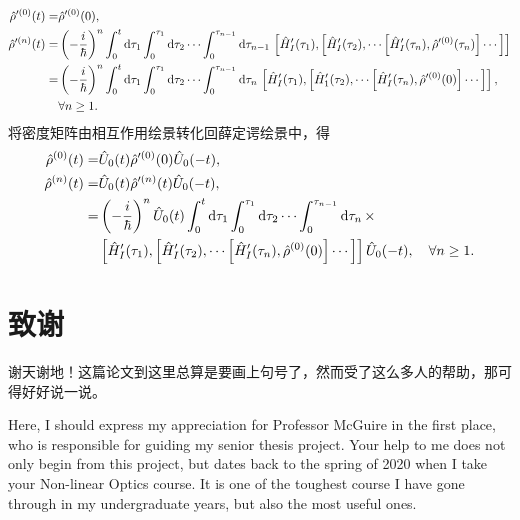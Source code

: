 \documentclass{thesis}
\begin{document}
\begin{align}
    \hat{\rho}'^{(0)}(t)=&\hat{\rho}'^{(0)}(0),\\
    \notag\hat{\rho}'^{(n)}(t)=&\left(-\frac{i}{\hbar}\right)^n\int_0^t\mathrm{d}\tau_1\int_0^{\tau_1}\mathrm{d}\tau_2\cdots\int_0^{\tau_{n-1}}\mathrm{d}\tau_{n-1}\,\left[\hat{H}_I'(\tau_1),\left[\hat{H}_I'(\tau_2),\cdots\left[\hat{H}_I'(\tau_n),\hat{\rho}'^{(0)}(\tau_n)\right]\cdots\right]\right]\\
    \notag=&\left(-\frac{i}{\hbar}\right)^n\int_0^t\mathrm{d}\tau_1\int_0^{\tau_1}\mathrm{d}\tau_2\cdots\int_0^{\tau_{n-1}}\mathrm{d}\tau_n\,\left[\hat{H}_I'(\tau_1),\left[\hat{H}_1'(\tau_2),\cdots\left[\hat{H}_I'(\tau_n),\hat{\rho}'^{(0)}(0)\right]\cdots\right]\right],\\
    &\forall n\geq 1.
\end{align}
将密度矩阵由相互作用绘景转化回薛定谔绘景中，得
\begin{align}
    \label{von Neumann Equ sol-1}
    \hat{\rho}^{(0)}(t)=&\hat{U}_0(t)\hat{\rho}'^{(0)}(0)\hat{U}_0(-t),\\
    \label{von Neumann Equ sol-2}
    \notag\hat{\rho}^{(n)}(t)=&\hat{U}_0(t)\hat{\rho}'^{(n)}(t)\hat{U}_0(-t),\\
    \notag=&\left(-\frac{i}{\hbar}\right)^n\hat{U}_0(t)\int_0^t\mathrm{d}\tau_1\int_0^{\tau_1}\mathrm{d}\tau_2\cdots\int_0^{\tau_{n-1}}\mathrm{d}\tau_n\,\times\\
    &\left[\hat{H}_I'(\tau_1),\left[\hat{H}_I'(\tau_2),\cdots\left[\hat{H}_I'(\tau_n),\hat{\rho}^{(0)}(0)\right]\cdots\right]\right]\hat{U}_0(-t),\quad\forall n\geq 1.
\end{align}

\backmatter%
\intotoc{\bibname}%

\chapter*{致谢}
谢天谢地！这篇论文到这里总算是要画上句号了，然而受了这么多人的帮助，那可得好好说一说。

Here, I should express my appreciation for Professor McGuire in the first place, who is responsible for guiding my senior thesis project. Your help to me does not only begin from this project, but dates back to the spring of 2020 when I take your Non-linear Optics course. It is one of the toughest course I have gone through in my undergraduate years, but also the most useful ones.
\end{document}
